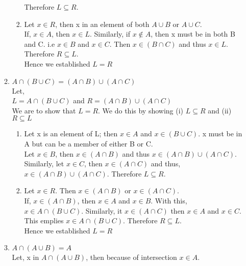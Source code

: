\documentclass[a4paper,12pt]{article}
\begin{document}
\begin{enumerate}
\begin{enumerate}
\begin{enumerate}
                    Therefore $L \subseteq R$.
                \item
                    Let $x \in R$, then x in an element of both $A \cup B$ or $A \cup C$. \\
                    If, $x \in A$, then $x \in L$. Similarly, if $x \not\in A$, then x must be in both B and C. i.e $x \in B$ and $x \in C$. Then $x \in (B \cap C)$ and thus $x \in L$. \\
                    Therefore $R \subseteq L$. \\
                    Hence we established $L = R$ \\
            \end{enumerate}
        \item
            $A \cap (B \cup C) = (A \cap B) \cup (A \cap C)$ \\
            Let,\\ $L = A \cap (B \cup C)$ and $R = (A \cap B) \cup (A \cap C)$ \\ 
            We are to show that $L = R$. We do this by showing (i) $L \subseteq R$ and (ii) $R \subseteq L$
            \begin{enumerate}
                \item
                    Let x is an element of L; then $x \in A$ and $x \in (B \cup C)$. x must be in A but can be a member of either B or C. \\
                    Let $x \in B$, then $x \in (A \cap B)$ and thus $x \in (A \cap B) \cup (A \cap C)$. Similarly, let $x \in C$, then $x \in (A \cap C)$ and thus, $x \in (A \cap B) \cup (A \cap C)$.
                    Therefore $L \subseteq R$.
                \item
                    Let $x \in R$. Then $x \in (A  \cap B)$ or $x \in (A \cap C)$. \\
                    If, $x \in (A \cap B)$, then $x \in A$ and $x \in B$. With this, $x \in A \cap (B \cup C)$. 
                    Similarly, it $x \in (A \cap C)$ then $x \in A$ and $x \in C$. This emplies $x \in A \cap (B \cup C)$.
                    Therefore $R \subseteq L$. \\
                    Hence we established $L = R$ \\
            \end{enumerate}
        \item
            $A \cap (A \cup B) = A$ \\
            Let, x in $A \cap (A \cup B)$, then because of intersection $x \in A$.\\

\end{enumerate}
\end{enumerate}
\end{document}

